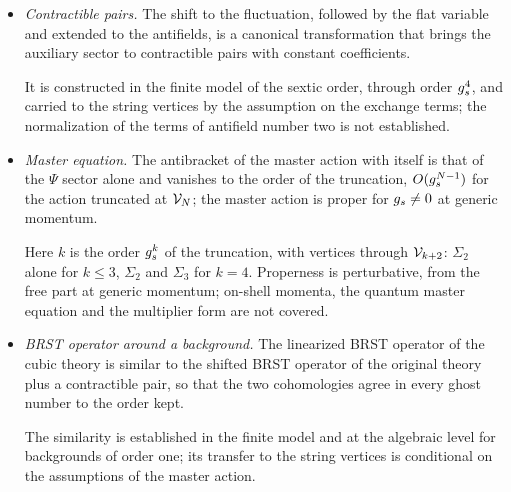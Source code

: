 \begin{itemize}
    The statement is made at the finite-dimensional algebraic level, for the laws at orders $\gs^3$ and $\gs^4$; that the same holds for the whole tower of auxiliary fields is suggested by the pattern, not proved.

  \item \emph{Contractible pairs.} The shift to the fluctuation, followed by the flat variable and extended to the antifields, is a canonical transformation that brings the auxiliary sector to contractible pairs with constant coefficients.


    It is constructed in the finite model of the sextic order, through order $\gs^4$, and carried to the string vertices by the assumption on the exchange terms; the normalization of the terms of antifield number two is not established.

  \item \emph{Master equation.} The antibracket of the master action with itself is that of the $\Psi$ sector alone and vanishes to the order of the truncation, $O(g_s^{N-1})$ for the action truncated at $\mathcal{V}_{N}$; the master action is proper for $g_s \neq 0$ at generic momentum.


    Here $k$ is the order $g_s^k$ of the truncation, with vertices through $\mathcal{V}_{k+2}$: $\Sigma_2$ alone for $k \le 3$, $\Sigma_2$ and $\Sigma_3$ for $k = 4$.
    Properness is perturbative, from the free part at generic momentum; on-shell momenta, the quantum master equation and the multiplier form are not covered.

  \item \emph{BRST operator around a background.} The linearized BRST operator of the cubic theory is similar to the shifted BRST operator of the original theory plus a contractible pair, so that the two cohomologies agree in every ghost number to the order kept.


    The similarity is established in the finite model and at the algebraic level for backgrounds of order one; its transfer to the string vertices is conditional on the assumptions of the master action.


\end{itemize}
